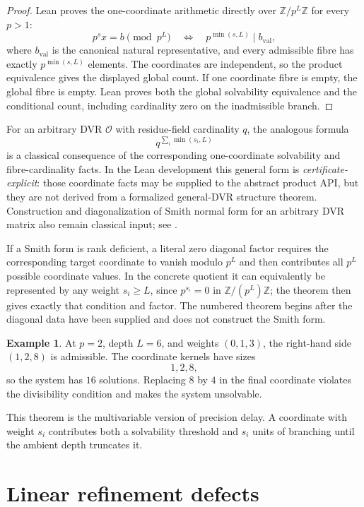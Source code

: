 \documentclass[11pt]{article}
\theoremstyle{definition}
\newtheorem{example}[theorem]{Example}
\theoremstyle{remark}
\newcommand{\Z}{\mathbb Z}
\newcommand{\OO}{\mathcal O}
\begin{document}
\begin{proof}
Lean proves the one-coordinate arithmetic directly over
$\mathbb Z/p^L\mathbb Z$ for every $p>1$:
\[
p^s x=b\pmod{p^L}
\quad\Longleftrightarrow\quad
p^{\min(s,L)}\mid b_{\mathrm{val}},
\]
where $b_{\mathrm{val}}$ is the canonical natural representative, and every
admissible fibre has exactly $p^{\min(s,L)}$ elements. The coordinates are
independent, so the product equivalence gives the displayed global count. If
one coordinate fibre is empty, the global fibre is empty. Lean proves both the
global solvability equivalence and the conditional count, including
cardinality zero on the inadmissible branch.
\end{proof}

For an arbitrary DVR $\OO$ with residue-field cardinality $q$, the analogous
formula
\[
q^{\sum_i\min(s_i,L)}
\]
is a classical consequence of the corresponding one-coordinate solvability
and fibre-cardinality facts. In the Lean development this general form is
\emph{certificate-explicit}: those coordinate facts may be supplied to the
abstract product API, but they are not derived from a formalized general-DVR
structure theorem. Construction and diagonalization of Smith normal form for
an arbitrary DVR matrix also remain classical input; see
\cite{serre1979,lang2002}.

If a Smith form is rank deficient, a literal zero diagonal factor requires
the corresponding target coordinate to vanish modulo $p^L$ and then
contributes all $p^L$ possible coordinate values. In the concrete quotient it
can equivalently be represented by any weight $s_i\ge L$, since
$p^{s_i}=0$ in $\Z/(p^L)\Z$; the theorem then gives exactly that condition and
factor. The numbered theorem begins after the diagonal data have been
supplied and does not construct the Smith form.

\begin{example}
At $p=2$, depth $L=6$, and weights $(0,1,3)$, the right-hand side $(1,2,8)$ is admissible. The coordinate kernels have sizes
\[
1,2,8,
\]
so the system has $16$ solutions. Replacing $8$ by $4$ in the final coordinate violates the divisibility condition and makes the system unsolvable.
\end{example}

This theorem is the multivariable version of precision delay. A coordinate with weight $s_i$ contributes both a solvability threshold and $s_i$ units of branching until the ambient depth truncates it.

\section{Linear refinement defects}
\end{document}
